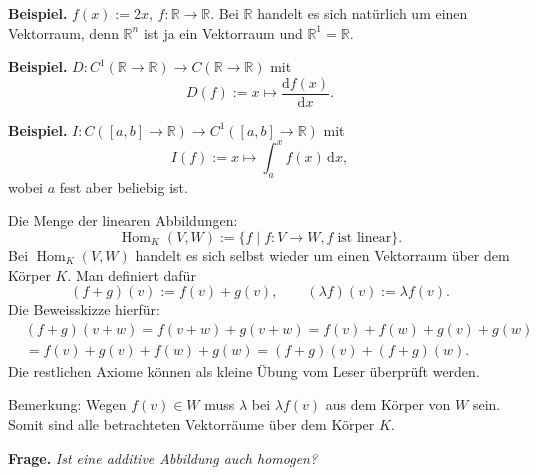 \documentclass[a4paper,11pt,fleqn,twoside]{scrartcl}
\numberwithin{equation}{section}
\newcommand{\R}{\mathbb R}
\newcommand{\strong}[1]{{\sf\bfseries #1}}
\begin{document}
\strong{Beispiel.} $f(x):=2x$, $f\colon\R\to\R$. Bei $\R$ handelt
es sich natürlich um einen Vektorraum, denn $\R^n$ ist ja ein
Vektorraum und $\R^1=\R$.

\strong{Beispiel.} $D\colon C^1(\R\to\R)\to C(\R\to\R)$ mit
\begin{equation}
D(f):=x\mapsto\frac{\mathrm df(x)}{\mathrm dx}.
\end{equation}

\strong{Beispiel.} $I\colon C([a,b]\to\R)\to C^1([a,b]\to\R)$ mit
\begin{equation}
I(f):=x\mapsto\int_a^x f(x)\,\mathrm dx,
\end{equation}
wobei $a$ fest aber beliebig ist.

Die Menge der linearen Abbildungen:
\begin{equation}
\operatorname{Hom}_K(V,W)
:= \{f\mid f\colon V\to W, f\;\text{ist linear}\}.
\end{equation}
Bei $\operatorname{Hom}_K(V,W)$ handelt es sich selbst wieder
um einen Vektorraum über dem Körper $K$. Man definiert dafür
\begin{equation}
(f+g)(v) := f(v)+g(v),\qquad
(\lambda f)(v) := \lambda f(v).
\end{equation}
Die Beweisskizze hierfür:
\[\begin{split}
&(f+g)(v+w) = f(v+w)+g(v+w) = f(v)+f(w)+g(v)+g(w)\\
&= f(v)+g(v)+f(w)+g(w) = (f+g)(v)+(f+g)(w).
\end{split}\]
Die restlichen Axiome können als kleine Übung vom Leser
überprüft werden.

Bemerkung: Wegen $f(v)\in W$ muss $\lambda$ bei $\lambda f(v)$ aus
dem Körper von $W$ sein. Somit sind alle betrachteten Vektorräume
über dem Körper $K$.

\strong{Frage.} \emph{Ist eine additive Abbildung auch homogen?}
\end{document}
